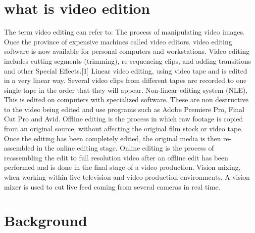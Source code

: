 
\section{what is video edition}
The term video editing can refer to: The process of manipulating video images. Once the province of expensive machines called video editors, video editing software is now available for personal computers and workstations. Video editing includes cutting segments (trimming), re-sequencing clips, and adding transitions and other Special Effects.[1]
Linear video editing, using video tape and is edited in a very linear way. Several video clips from different tapes are recorded to one single tape in the order that they will appear.
Non-linear editing system (NLE), This is edited on computers with specialized software. These are non destructive to the video being edited and use programs such as Adobe Premiere Pro, Final Cut Pro and Avid.
Offline editing is the process in which raw footage is copied from an original source, without affecting the original film stock or video tape. Once the editing has been completely edited, the original media is then re-assembled in the online editing stage.
Online editing is the process of reassembling the edit to full resolution video after an offline edit has been performed and is done in the final stage of a video production.
Vision mixing, when working within live television and video production environments. A vision mixer is used to cut live feed coming from several cameras in real time.

\section{Background}

